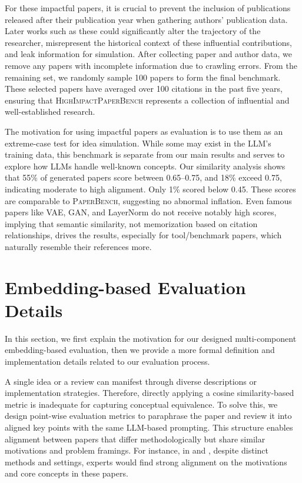For these impactful papers, it is crucial to prevent the inclusion of publications released after their publication year when gathering authors' publication data. Later works such as these could significantly alter the trajectory of the researcher, misrepresent the historical context of these influential contributions, and leak information for simulation. After collecting paper and author data, we remove any papers with incomplete information due to crawling errors. From the remaining set, we randomly sample 100 papers to form the final benchmark. These selected papers have averaged over 100 citations in the past five years, ensuring that \textsc{HighImpactPaperBench} represents a collection of influential and well-established research.

The motivation for using impactful papers as evaluation is to use them as an extreme-case test for idea simulation. While some may exist in the LLM’s training data, this benchmark is separate from our main results and serves to explore how LLMs handle well-known concepts. Our similarity analysis shows that 55\% of generated papers score between 0.65–0.75, and 18\% exceed 0.75, indicating moderate to high alignment. Only 1\% scored below 0.45. These scores are comparable to \textsc{PaperBench}, suggesting no abnormal inflation. Even famous papers like VAE, GAN, and LayerNorm do not receive notably high scores, implying that semantic similarity, not memorization based on citation relationships, drives the results, especially for tool/benchmark papers, which naturally resemble their references more.


\section{Embedding-based Evaluation Details}
\label{evaluation-details}
In this section, we first explain the motivation for our designed multi-component embedding-based evaluation, then we provide a more formal definition and implementation details related to our evaluation process.

 A single idea or a review can manifest through diverse descriptions or implementation strategies. Therefore, directly applying a cosine similarity-based metric is inadequate for capturing conceptual equivalence. To solve this, we design point-wise evaluation metrics to paraphrase the paper and review it into aligned key points with the same LLM-based prompting. This structure enables alignment between papers that differ methodologically but share similar motivations and problem framings. For instance, in \citet{chen2025learning} and \citet{jin2025search}, despite distinct methods and settings, experts would find strong alignment on the motivations and core concepts in these papers.

